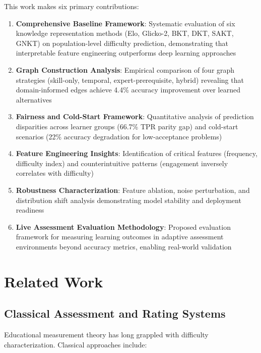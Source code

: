 \documentclass[conference]{IEEEtran}
\begin{document}
This work makes six primary contributions:

\begin{enumerate}
    \item \textbf{Comprehensive Baseline Framework}: Systematic evaluation of six knowledge representation methods (Elo, Glicko-2, BKT, DKT, SAKT, GNKT) on population-level difficulty prediction, demonstrating that interpretable feature engineering outperforms deep learning approaches
    
    \item \textbf{Graph Construction Analysis}: Empirical comparison of four graph strategies (skill-only, temporal, expert-prerequisite, hybrid) revealing that domain-informed edges achieve 4.4\% accuracy improvement over learned alternatives
    
    \item \textbf{Fairness and Cold-Start Framework}: Quantitative analysis of prediction disparities across learner groups (66.7\% TPR parity gap) and cold-start scenarios (22\% accuracy degradation for low-acceptance problems)
    
    \item \textbf{Feature Engineering Insights}: Identification of critical features (frequency, difficulty index) and counterintuitive patterns (engagement inversely correlates with difficulty)
    
    \item \textbf{Robustness Characterization}: Feature ablation, noise perturbation, and distribution shift analysis demonstrating model stability and deployment readiness
    
    \item \textbf{Live Assessment Evaluation Methodology}: Proposed evaluation framework for measuring learning outcomes in adaptive assessment environments beyond accuracy metrics, enabling real-world validation
\end{enumerate}

\section{Related Work}

\subsection{Classical Assessment and Rating Systems}

Educational measurement theory has long grappled with difficulty characterization. Classical approaches include:
\end{document}
